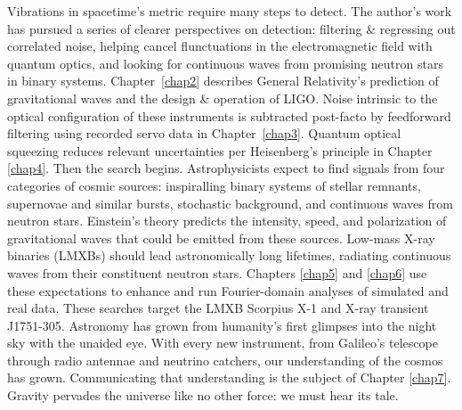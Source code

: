 Vibrations in spacetime's metric require many steps to detect.
The author's work has pursued a series of clearer perspectives on detection: filtering \& regressing out correlated noise, helping cancel flunctuations in the electromagnetic field with quantum optics, and looking for continuous waves from promising neutron stars in binary systems. 
Chapter~\ref{chap2} describes General Relativity's prediction of gravitational waves and the design \& operation of LIGO.
Noise intrinsic to the optical configuration of these instruments is subtracted post-facto by feedforward filtering using recorded servo data in Chapter~\ref{chap3}. 
Quantum optical squeezing reduces relevant uncertainties per Heisenberg's principle in Chapter \ref{chap4}.
Then the search begins.
Astrophysicists expect to find signals from four categories of cosmic sources: inspiralling binary systems of stellar remnants, supernovae and similar bursts, stochastic background, and continuous waves from neutron stars.
Einstein's theory predicts the intensity, speed, and polarization of gravitational waves that could be emitted from these sources.
Low-mass X-ray binaries (LMXBs) should lead astronomically long lifetimes, radiating continuous waves from their constituent neutron stars.
Chapters \ref{chap5} and \ref{chap6} use these expectations to enhance and run Fourier-domain analyses of simulated and real data.
These searches target the LMXB Scorpius X-1 and X-ray transient J1751-305.
Astronomy has grown from humanity's first glimpses into the night sky with the unaided eye. 
With every new instrument, from Galileo's telescope through radio antennae and neutrino catchers, our understanding of the cosmos has grown. 
Communicating that understanding is the subject of Chapter \ref{chap7}.
Gravity pervades the universe like no other force: we must hear its tale. 
        

            
%

